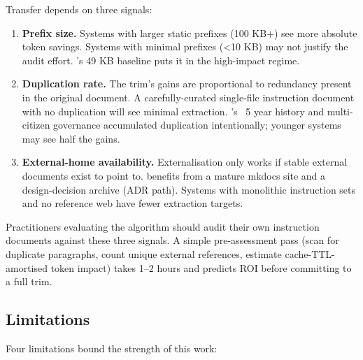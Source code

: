 Transfer depends on three signals:

\begin{enumerate}
  \item \textbf{Prefix size.} Systems with larger static prefixes (100 KB+)
    see more absolute token savings. Systems with minimal prefixes (<10 KB)
    may not justify the audit effort. \blackrim's 49 KB baseline puts it
    in the high-impact regime.
  \item \textbf{Duplication rate.} The trim's gains are proportional to
    redundancy present in the original document. A carefully-curated
    single-file instruction document with no duplication will see
    minimal extraction. \blackrim's ~5 year history and multi-citizen
    governance accumulated duplication intentionally; younger systems
    may see half the gains.
  \item \textbf{External-home availability.} Externalisation only works
    if stable external documents exist to point to. \blackrim benefits
    from a mature mkdocs site and a design-decision archive (ADR path).
    Systems with monolithic instruction sets and no reference web have
    fewer extraction targets.
\end{enumerate}

Practitioners evaluating the algorithm should audit their own instruction
documents against these three signals. A simple pre-assessment pass (scan
for duplicate paragraphs, count unique external references, estimate
cache-TTL-amortised token impact) takes 1--2 hours and predicts ROI
before committing to a full trim.

\subsection{Limitations}

Four limitations bound the strength of this work:

